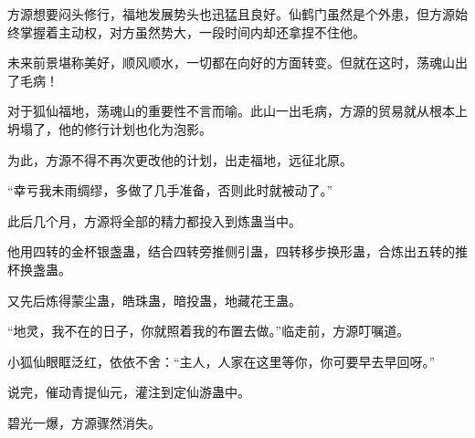 \begin{this_body}
方源想要闷头修行，福地发展势头也迅猛且良好。仙鹤门虽然是个外患，但方源始终掌握着主动权，对方虽然势大，一段时间内却还拿捏不住他。

未来前景堪称美好，顺风顺水，一切都在向好的方面转变。但就在这时，荡魂山出了毛病！

对于狐仙福地，荡魂山的重要性不言而喻。此山一出毛病，方源的贸易就从根本上坍塌了，他的修行计划也化为泡影。

为此，方源不得不再次更改他的计划，出走福地，远征北原。

“幸亏我未雨绸缪，多做了几手准备，否则此时就被动了。”

此后几个月，方源将全部的精力都投入到炼蛊当中。

他用四转的金杯银盏蛊，结合四转旁推侧引蛊，四转移步换形蛊，合炼出五转的推杯换盏蛊。

又先后炼得蒙尘蛊，皓珠蛊，暗投蛊，地藏花王蛊。

“地灵，我不在的日子，你就照着我的布置去做。”临走前，方源叮嘱道。

小狐仙眼眶泛红，依依不舍：“主人，人家在这里等你，你可要早去早回呀。”

说完，催动青提仙元，灌注到定仙游蛊中。

碧光一爆，方源骤然消失。

\end{this_body}

